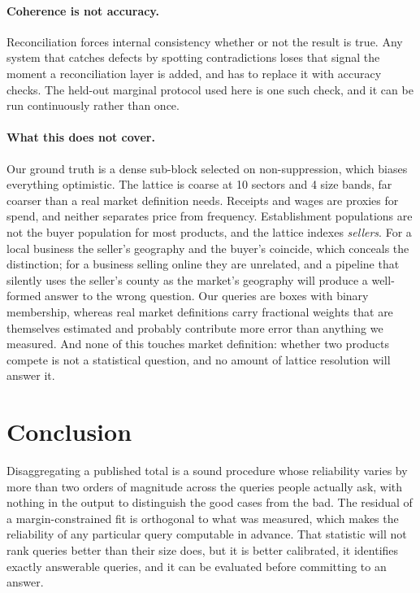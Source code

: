 \documentclass[11pt]{article}
\begin{document}
\paragraph{Coherence is not accuracy.} Reconciliation forces internal consistency
whether or not the result is true. Any system that catches defects by spotting
contradictions loses that signal the moment a reconciliation layer is added, and
has to replace it with accuracy checks. The held-out marginal protocol used here
is one such check, and it can be run continuously rather than once.

\paragraph{What this does not cover.} Our ground truth is a dense sub-block
selected on non-suppression, which biases everything optimistic. The lattice is
coarse at 10 sectors and 4 size bands, far coarser than a real market definition
needs. Receipts and wages are proxies for spend, and neither separates price from
frequency. Establishment populations are not the buyer population for most
products, and the lattice indexes \emph{sellers}. For a local business the
seller's geography and the buyer's coincide, which conceals the distinction; for
a business selling online they are unrelated, and a pipeline that silently uses
the seller's county as the market's geography will produce a well-formed answer
to the wrong question. Our queries are boxes with binary membership, whereas real market
definitions carry fractional weights that are themselves estimated and probably
contribute more error than anything we measured. And none of this touches market
definition: whether two products compete is not a statistical question, and no
amount of lattice resolution will answer it.

\section{Conclusion}

Disaggregating a published total is a sound procedure whose reliability varies by
more than two orders of magnitude across the queries people actually ask, with
nothing in the output to distinguish the good cases from the bad. The residual of
a margin-constrained fit is orthogonal to what was measured, which makes the
reliability of any particular query computable in advance. That statistic will
not rank queries better than their size does, but it is better calibrated, it
identifies exactly answerable queries, and it can be evaluated before committing
to an answer.
\end{document}
